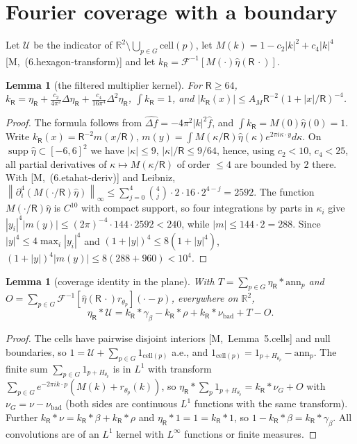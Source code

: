 \documentclass[11pt,reqno]{amsart}
\numberwithin{equation}{section}
\theoremstyle{plain}
\newtheorem{lemma}[theorem]{Lemma}
\theoremstyle{definition}
\newcommand{\R}{\mathbb{R}}
\newcommand{\supp}{\operatorname{supp}}
\newcommand{\bad}{\mathrm{bad}}
\newcommand{\norm}[1]{\left\|#1\right\|}
\newcommand{\cU}{\mathcal{U}}
\newcommand{\fR}{\mathsf{R}}
\newcommand{\ms}[1]{\textup{[M,~#1]}}
\begin{document}
\section{Fourier coverage with a boundary}\label{sec:coverage}

Let $\cU$ be the indicator of $\R^2\setminus\bigcup_{p\in G}\mathrm{cell}(p)$, let $M(k)=1-c_2|k|^2+c_4|k|^4$ \ms{(6.hexagon-transform)} and let $k_\fR=\mathcal F^{-1}[M(\cdot)\widehat\eta(\fR\,\cdot)]$.

\begin{lemma}[the filtered multiplier kernel]\label{lem:kR}
For $\fR\ge64$, $k_\fR=\eta_\fR+\frac{c_2}{4\pi^2}\Delta\eta_\fR+\frac{c_4}{16\pi^4}\Delta^2\eta_\fR$, $\int k_\fR=1$, and $|k_\fR(x)|\le A_M\fR^{-2}(1+|x|/\fR)^{-4}$.
\end{lemma}
\begin{proof}
The formula follows from $\widehat{\Delta f}=-4\pi^2|k|^2\widehat f$, and $\int k_\fR=M(0)\widehat\eta(0)=1$.  Write $k_\fR(x)=\fR^{-2}m(x/\fR)$, $m(y)=\int M(\kappa/\fR)\widehat\eta(\kappa)e^{2\pi i\kappa\cdot y}d\kappa$.  On $\supp\widehat\eta\subset[-6,6]^2$ we have $|\kappa|\le9$, $|\kappa|/\fR\le9/64$, hence, using $c_2<10$, $c_4<25$, all partial derivatives of $\kappa\mapsto M(\kappa/\fR)$ of order $\le4$ are bounded by $2$ there.  With \ms{(6.etahat-deriv)} and Leibniz, $\norm{\partial_i^4(M(\cdot/\fR)\widehat\eta)}_\infty\le\sum_{j=0}^4\binom4j\cdot2\cdot16\cdot2^{4-j}=2592$.  The function $M(\cdot/\fR)\widehat\eta$ is $C^{10}$ with compact support, so four integrations by parts in $\kappa_i$ give $|y_i|^4|m(y)|\le(2\pi)^{-4}\cdot144\cdot2592<240$, while $|m|\le144\cdot2=288$.  Since $|y|^4\le4\max_i|y_i|^4$ and $(1+|y|)^4\le8(1+|y|^4)$, $(1+|y|)^4|m(y)|\le8(288+960)<10^4$.
\end{proof}

\begin{lemma}[coverage identity in the plane]\label{lem:coverageplane}
With $T=\sum_{p\in G}\eta_\fR*\mathrm{ann}_p$ and $O=\sum_{p\in G}\mathcal F^{-1}[\widehat\eta(\fR\,\cdot)r_{\theta_p}](\cdot-p)$, everywhere on $\R^2$,
\begin{equation}\label{eq:coverageplane}
\eta_\fR*\cU=k_\fR*\gamma_\beta-k_\fR*\rho+k_\fR*\nu_\bad+T-O .
\end{equation}
\end{lemma}
\begin{proof}
The cells have pairwise disjoint interiors \ms{Lemma~5.cells} and null boundaries, so $1=\cU+\sum_{p\in G}1_{\mathrm{cell}(p)}$ a.e., and $1_{\mathrm{cell}(p)}=1_{p+H_{\theta_p}}-\mathrm{ann}_p$.  The finite sum $\sum_{p\in G}1_{p+H_{\theta_p}}$ is in $L^1$ with transform $\sum_{p\in G}e^{-2\pi ik\cdot p}(M(k)+r_{\theta_p}(k))$, so $\eta_\fR*\sum_p1_{p+H_{\theta_p}}=k_\fR*\nu_G+O$ with $\nu_G=\nu-\nu_\bad$ (both sides are continuous $L^1$ functions with the same transform).  Further $k_\fR*\nu=k_\fR*\beta+k_\fR*\rho$ and $\eta_\fR*1=1=k_\fR*1$, so $1-k_\fR*\beta=k_\fR*\gamma_\beta$.  All convolutions are of an $L^1$ kernel with $L^\infty$ functions or finite measures.
\end{proof}
\end{document}

